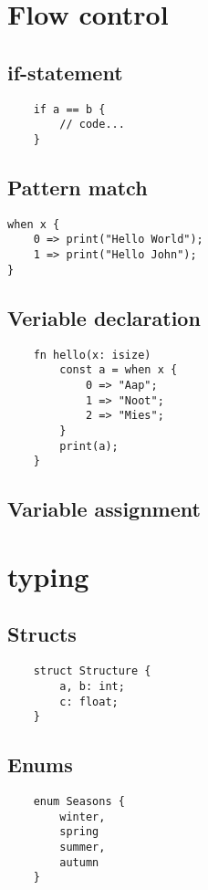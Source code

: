 \documentclass{report}
\begin{document}
\section{Flow control}

\subsection{if-statement}
\begin{verbatim}
    if a == b {
        // code...
    }
\end{verbatim}


\subsection {Pattern match}

\begin{verbatim}
when x {
    0 => print("Hello World");
    1 => print("Hello John");
}
\end{verbatim}



\subsection{Veriable declaration}

\begin{verbatim}
    fn hello(x: isize)
        const a = when x {
            0 => "Aap";
            1 => "Noot";
            2 => "Mies";
        }
        print(a);
    }
\end{verbatim}


\subsection{Variable assignment}

\section {typing}
\subsection {Structs}
\begin{verbatim}
    struct Structure {
        a, b: int;
        c: float;
    }
    \end{verbatim}

\subsection {Enums}
\begin{verbatim}
    enum Seasons {
        winter,
        spring
        summer,
        autumn
    }
\end{verbatim}
\end{document}
